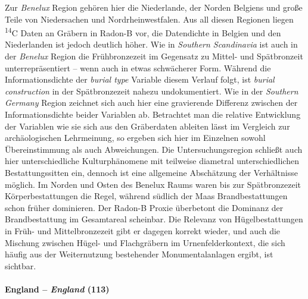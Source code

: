 \documentclass[openany,twoside,twocolumn]{book}
\begin{document}
Zur \emph{Benelux} Region gehören hier die Niederlande, der Norden
Belgiens und große Teile von Niedersachen und Nordrheinwestfalen. Aus
all diesen Regionen liegen \textsuperscript{14}C Daten an Gräbern in
Radon-B vor, die Datendichte in Belgien und den Niederlanden ist jedoch
deutlich höher. Wie in \emph{Southern Scandinavia} ist auch in der
\emph{Benelux} Region die Frühbronzezeit im Gegensatz zu Mittel- und
Spätbronzeit unterrepräsentiert -- wenn auch in etwas schwächerer Form.
Während die Informationsdichte der \emph{burial type} Variable diesem
Verlauf folgt, ist \emph{burial construction} in der Spätbronzezeit
nahezu undokumentiert. Wie in der \emph{Southern Germany} Region
zeichnet sich auch hier eine gravierende Differenz zwischen der
Informationsdichte beider Variablen ab. Betrachtet man die relative
Entwicklung der Variablen wie sie sich aus den Gräberdaten ableiten
lässt im Vergleich zur archäologischen Lehrmeinung, so ergeben sich hier
im Einzelnen sowohl Übereinstimmung als auch Abweichungen. Die
Untersuchungsregion schließt auch hier unterschiedliche Kulturphänomene
mit teilweise diametral unterschiedlichen Bestattungssitten ein, dennoch
ist eine allgemeine Abschätzung der Verhältnisse möglich. Im Norden und
Osten des Benelux Raums waren bis zur Spätbronzezeit Körperbestattungen
die Regel, während südlich der Maas Brandbestattungen schon früher
dominieren. Der Radon-B Proxie überbetont die Dominanz der
Brandbestattung im Gesamtareal scheinbar. Die Relevanz von
Hügelbestattungen in Früh- und Mittelbronzezeit gibt er dagegen korrekt
wieder, und auch die Mischung zwischen Hügel- und Flachgräbern im
Urnenfelderkontext, die sich häufig aus der Weiternutzung bestehender
Monumentalanlagen ergibt, ist sichtbar.

\hypertarget{england-england-113}{%
\paragraph{\texorpdfstring{England -- \emph{England}
(113)}{England -- England (113)}}\label{england-england-113}}
\end{document}
